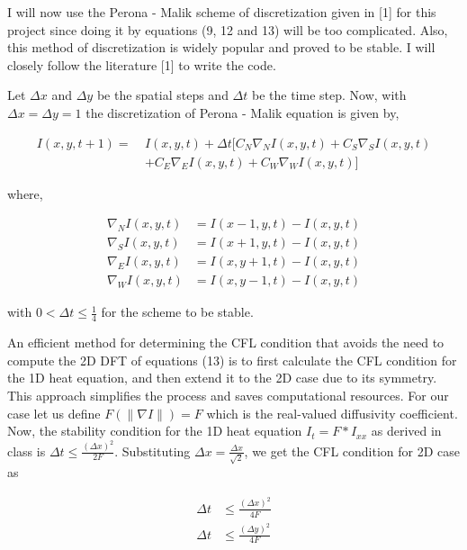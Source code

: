 \documentclass{article}
\begin{document}
I will now use the Perona - Malik scheme of discretization given in [1] for this project since doing it by equations (9, 12 and 13) will be too complicated. Also, this method of discretization is widely popular and proved to be stable. I will closely follow the literature [1] to write the code.

Let \(\Delta x\) and \(\Delta y\) be the spatial steps and \(\Delta t\) be the time step. Now, with \(\Delta x = \Delta y = 1\) the discretization of Perona - Malik equation is given by,


\begin{align}
I(x, y, t + 1) =\ &I(x, y, t) + \Delta t \big[C_N \nabla_N I(x, y, t) + C_S \nabla_S I(x, y, t) \nonumber \\
&+ C_E \nabla_E I(x, y, t) + C_W \nabla_W I(x, y, t)\big]
\end{align}


where,

\begin{align}
\nabla_N I(x, y, t) &= I(x - 1, y, t) - I(x, y, t) \\
\nabla_S I(x, y, t) &= I(x + 1, y, t) - I(x, y, t) \\
\nabla_E I(x, y, t) &= I(x, y + 1, t) - I(x, y, t) \\
\nabla_W I(x, y, t) &= I(x, y - 1, t) - I(x, y, t)
\end{align}

with \( 0 < \Delta t \leq \frac{1}{4} \) for the scheme to be stable.

An efficient method for determining the CFL condition that avoids the need to compute the 2D DFT of equations (13) is to first calculate the CFL condition for the 1D heat equation, and then extend it to the 2D case due to its symmetry. This approach simplifies the process and saves computational resources. For our case let us define \( F(\|\nabla I\|) = F \) which is the real-valued diffusivity coefficient. Now, the stability condition for the 1D heat equation \( I_t = F * I_{xx} \) as derived in class is \( \Delta t \leq \frac{(\Delta x)^2}{2F} \). Substituting \(\Delta x = \frac{\Delta x}{\sqrt{2}} \), we get the CFL condition for 2D case as

\begin{align}
\Delta t &\leq \frac{(\Delta x)^2}{4F} \\
\Delta t &\leq \frac{(\Delta y)^2}{4F}
\end{align}
\end{document}
